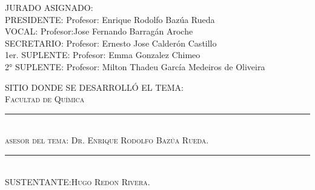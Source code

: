 \begin{minipage}[c][\textheight][s]{5.125in}
JURADO ASIGNADO:\\[0.5cm]

PRESIDENTE:		Profesor: Enrique Rodolfo Bazúa Rueda\\
VOCAL: 		Profesor:Jose Fernando Barragán Aroche\\
SECRETARIO:		Profesor: Ernesto Jose Calderón Castillo\\
1er.  SUPLENTE: 	Profesor: Emma Gonzalez Chimeo\\
2° SUPLENTE:		Profesor: Milton Thadeu García Medeiros de Oliveira\\[0.5cm]

\begin{center}
	SITIO DONDE SE DESARROLLÓ EL TEMA:\\
	\textsc{Facultad de Química}\\[3cm]


	\rule{6cm}{1pt}\\
	\textsc{asesor del tema: Dr. Enrique Rodolfo Bazúa Rueda.} \\[3cm]


	\rule{6cm}{1pt}\\
	\textsc{SUSTENTANTE:Hugo Redon Rivera.} 
\end{center}
\end{minipage}
